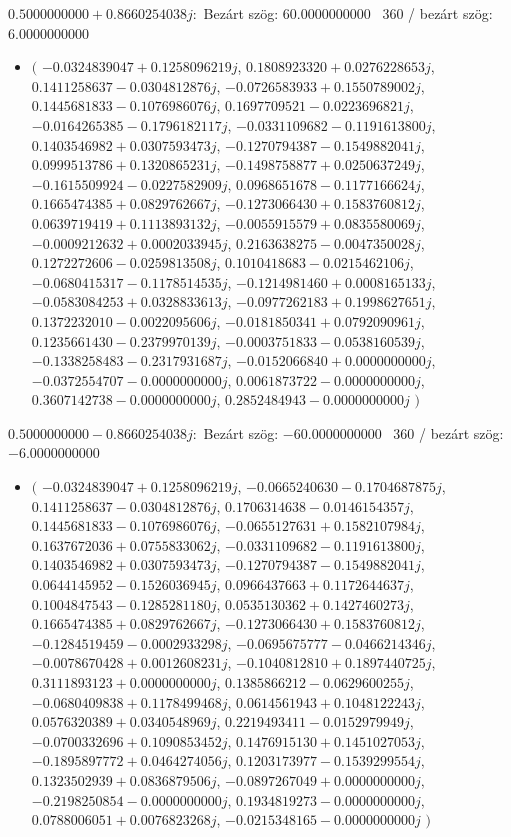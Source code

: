 \documentclass[14pt,a4paper]{article}
\begin{document}
$0.5000000000+0.8660254038j$:\
Bezárt szög: $60.0000000000$ \
360 / bezárt szög: $6.0000000000$\
\begin{itemize}
\item
$\big($
$-0.0324839047+0.1258096219j$, $0.1808923320+0.0276228653j$, $0.1411258637-0.0304812876j$, $-0.0726583933+0.1550789002j$, $0.1445681833-0.1076986076j$, $0.1697709521-0.0223696821j$, $-0.0164265385-0.1796182117j$, $-0.0331109682-0.1191613800j$, $0.1403546982+0.0307593473j$, $-0.1270794387-0.1549882041j$, $0.0999513786+0.1320865231j$, $-0.1498758877+0.0250637249j$, $-0.1615509924-0.0227582909j$, $0.0968651678-0.1177166624j$, $0.1665474385+0.0829762667j$, $-0.1273066430+0.1583760812j$, $0.0639719419+0.1113893132j$, $-0.0055915579+0.0835580069j$, $-0.0009212632+0.0002033945j$, $0.2163638275-0.0047350028j$, $0.1272272606-0.0259813508j$, $0.1010418683-0.0215462106j$, $-0.0680415317-0.1178514535j$, $-0.1214981460+0.0008165133j$, $-0.0583084253+0.0328833613j$, $-0.0977262183+0.1998627651j$, $0.1372232010-0.0022095606j$, $-0.0181850341+0.0792090961j$, $0.1235661430-0.2379970139j$, $-0.0003751833-0.0538160539j$, $-0.1338258483-0.2317931687j$, $-0.0152066840+0.0000000000j$, $-0.0372554707-0.0000000000j$, $0.0061873722-0.0000000000j$, $0.3607142738-0.0000000000j$, $0.2852484943-0.0000000000j$
$\big)$
\end{itemize}
$0.5000000000-0.8660254038j$:\
Bezárt szög: $-60.0000000000$ \
360 / bezárt szög: $-6.0000000000$\
\begin{itemize}
\item
$\big($
$-0.0324839047+0.1258096219j$, $-0.0665240630-0.1704687875j$, $0.1411258637-0.0304812876j$, $0.1706314638-0.0146154357j$, $0.1445681833-0.1076986076j$, $-0.0655127631+0.1582107984j$, $0.1637672036+0.0755833062j$, $-0.0331109682-0.1191613800j$, $0.1403546982+0.0307593473j$, $-0.1270794387-0.1549882041j$, $0.0644145952-0.1526036945j$, $0.0966437663+0.1172644637j$, $0.1004847543-0.1285281180j$, $0.0535130362+0.1427460273j$, $0.1665474385+0.0829762667j$, $-0.1273066430+0.1583760812j$, $-0.1284519459-0.0002933298j$, $-0.0695675777-0.0466214346j$, $-0.0078670428+0.0012608231j$, $-0.1040812810+0.1897440725j$, $0.3111893123+0.0000000000j$, $0.1385866212-0.0629600255j$, $-0.0680409838+0.1178499468j$, $0.0614561943+0.1048122243j$, $0.0576320389+0.0340548969j$, $0.2219493411-0.0152979949j$, $-0.0700332696+0.1090853452j$, $0.1476915130+0.1451027053j$, $-0.1895897772+0.0464274056j$, $0.1203173977-0.1539299554j$, $0.1323502939+0.0836879506j$, $-0.0897267049+0.0000000000j$, $-0.2198250854-0.0000000000j$, $0.1934819273-0.0000000000j$, $0.0788006051+0.0076823268j$, $-0.0215348165-0.0000000000j$
$\big)$
\end{itemize}
\end{document}
